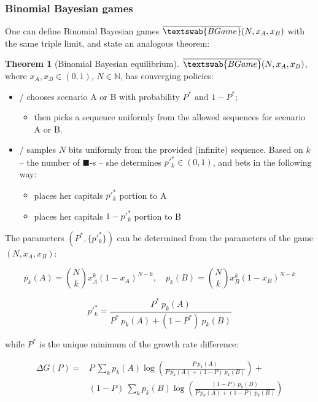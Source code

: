 \documentclass{article}
\newcommand{\bb}{\blacksquare}
\theoremstyle{definition}
\newtheorem{theorem}{Theorem}[section]
\newcommand{\InfBG}[1]{$\overline{\textswab{BGame}}(#1)$}
\begin{document}
\subsubsection{Binomial Bayesian games}

One can define Binomial Bayesian games \InfBG{N,x_A,x_B} with the same triple limit,
and state an analogous theorem:

\begin{theorem}[Binomial Bayesian equilibrium]
\label{thm:BayesianBinomial}
\InfBG{N,x_A,x_B}, where $x_A, x_B \in (0,1)$, $N \in \mathbb{N}$, has converging policies:

\begin{itemize}
    \item \PII/ chooses scenario A or B with probability $P^*$ and $1-P^*$;
    \begin{itemize}
        \item then picks a sequence uniformly from the allowed sequences for scenario A or B.
    \end{itemize}

    \item \PI/ samples $N$ bits uniformly from the provided (infinite) sequence. Based on $k$ -- the number of $\bb$-s -- she determines $p'^*_k \in (0,1)$, and bets in the following way:
    \begin{itemize}
        \item places her capitals $p'^*_k$ portion to A
        \item places her capitals $1-p'^*_k$ portion to B
    \end{itemize}
\end{itemize}

The parameters $(P^*, \{p'^*_k\})$ can be determined from the parameters of the game $(N, x_A, x_B)$:

\begin{equation}
    p_k(A) = \binom{N}{k} x_A^k (1-x_A)^{N-k}, \quad
    p_k(B) = \binom{N}{k} x_B^k (1-x_B)^{N-k}
\end{equation}

\begin{equation}
    \label{eq:BinomialBayesianpp}
    p'^*_k = \frac{P^* \ p_k(A)}{P^* \ p_k(A) + (1-P^*) \ p_k(B)}
\end{equation}

while $P^*$ is the unique minimum of the growth rate difference:

\begin{equation}
    \label{eq:BinomialBayesianP}
    \begin{split}
        \Delta G(P)=&P \ \sum_{k} p_k(A) \log \left ( \frac{P \ p_k(A)}{P \ p_k(A)+(1-P) \ p_k(B)} \right ) + \\
                    &(1-P) \ \sum_{k} p_k(B) \log \left ( \frac{(1-P) \ p_k(B)}{P \  p_k(A)+(1-P) \ p_k(B)} \right )
    \end{split}
\end{equation}

\end{theorem}
\end{document}
